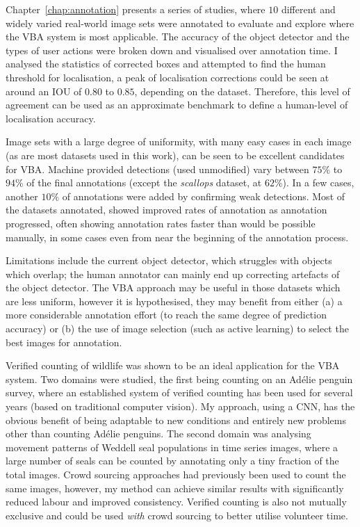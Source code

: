 Chapter~\ref{chap:annotation} presents a series of studies, where $10$ different and widely varied real-world image sets were annotated to evaluate and explore where the \gls{VBA} system is most applicable. The accuracy of the object detector and the types of user actions were broken down and visualised over annotation time. I analysed the statistics of corrected boxes and attempted to find the human threshold for localisation, a peak of localisation corrections could be seen at around an \gls{IOU} of $0.80$ to $0.85$, depending on the dataset. Therefore, this level of agreement can be used as an approximate benchmark to define a human-level of localisation accuracy.

Image sets with a large degree of uniformity, with many easy cases in each image (as are most datasets used in this work), can be seen to be excellent candidates for \gls{VBA}. Machine provided detections (used unmodified) vary between $75\%$ to $94\%$ of the final annotations (except the \emph{scallops} dataset, at $62\%$). In a few cases, another $10\%$ of annotations were added by confirming weak detections. Most of the datasets annotated, showed improved rates of annotation as annotation progressed, often showing annotation rates faster than would be possible manually, in some cases even from near the beginning of the annotation process. 

Limitations include the current object detector, which struggles with objects which overlap; the human annotator can mainly end up correcting artefacts of the object detector. The \gls{VBA} approach may be useful in those datasets which are less uniform, however it is hypothesised, they may benefit from either (a) a more considerable annotation effort (to reach the same degree of prediction accuracy) or (b) the use of image selection (such as active learning) to select the best images for annotation.

Verified counting of wildlife was shown to be an ideal application for the \gls{VBA} system. Two domains were studied, the first being counting on an Ad\'elie penguin survey, where an established system of verified counting has been used for several years (based on traditional computer vision). My approach, using a \gls{CNN}, has the obvious benefit of being adaptable to new conditions and entirely new problems other than counting Ad\'elie penguins. The second domain was analysing movement patterns of Weddell seal populations in time series images, where a large number of seals can be counted by annotating only a tiny fraction of the total images. Crowd sourcing approaches had previously been used to count the same images, however, my method can achieve similar results with significantly reduced labour and improved consistency. Verified counting is also not mutually exclusive and could be used \emph{with} crowd sourcing to better utilise volunteer time.

